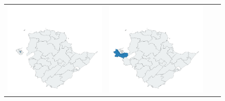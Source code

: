 \begin{figure}[p]
\begin{tabularx}{1\textwidth}{XXXX}
\includegraphics[width=1\linewidth]{images/ch6/loading/21}&
\includegraphics[width=1\linewidth]{images/ch6/loading/22}&

\end{tabularx}
\end{figure}
